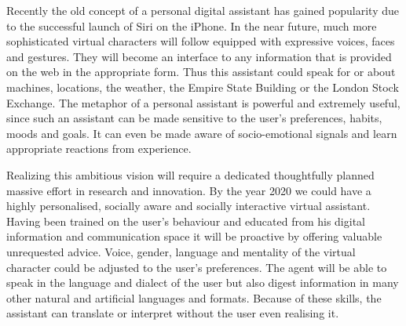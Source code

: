 \documentclass[10pt, plain]{../../metanetpaper}
\begin{document}
\begin{multicols}{2}
 

Recently the old concept of a personal digital assistant has gained popularity due to the successful launch of Siri on the iPhone. In the near future, much more sophisticated virtual characters will follow equipped with expressive voices, faces and gestures. They will become an interface to any information that is provided on the web in the appropriate form. Thus this assistant could speak for or about machines, locations, the weather, the Empire State Building or the London Stock Exchange. The metaphor of a personal assistant is powerful and extremely useful, since such an assistant can be made sensitive to the user’s preferences, habits, moods and goals. It can even be made aware of socio-emotional signals and learn appropriate reactions from experience.  
 
Realizing this ambitious vision will require a dedicated thoughtfully planned massive effort in research and innovation. By the year 2020 we could have a highly personalised, socially aware and socially interactive virtual assistant. Having been trained on the user’s behaviour and educated from his digital information and communication space it will be proactive by offering valuable unrequested advice. Voice, gender, language and mentality of the virtual character could be adjusted to the user’s preferences.  The agent will be able to speak in the language and dialect of the user but also digest information in many other natural and artificial languages and formats. Because of these skills, the assistant can translate or interpret without the user even realising it.
 
 

\end{multicols}
\end{document}
